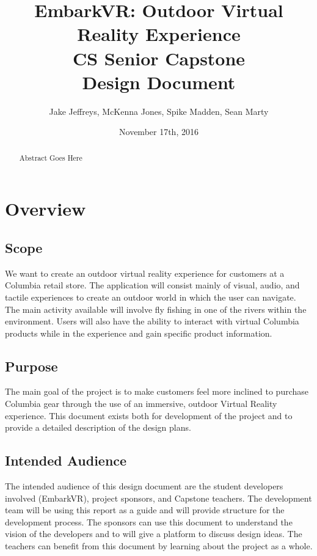 \documentclass[10pt,journal,compsoc,onecolumn, draftclsnofoot]{IEEEtran}
\title{
EmbarkVR: Outdoor Virtual Reality Experience \\
CS Senior Capstone \\
Design Document\\
\vspace{3cm}
}
\author{Jake Jeffreys, McKenna Jones, Spike Madden, Sean Marty}
\date{November 17th, 2016}
\begin{document}
\begin{titlepage}
\vspace{3cm}
\maketitle
\vspace{3cm}
\begin{abstract}
Abstract Goes Here
\end{abstract}

\end{titlepage}
\tableofcontents
\clearpage

\section{Overview}
\subsection{Scope}
We want to create an outdoor virtual reality experience for customers at a Columbia retail store. The application will consist mainly of visual, audio, and tactile experiences to create an outdoor world in which the user can navigate. The main activity available will involve fly fishing in one of the rivers within the environment. Users will also have the ability to interact with virtual Columbia products while in the experience and gain specific product information.

\subsection{Purpose}
The main goal of the project is to make customers feel more inclined to purchase Columbia gear through the use of an immersive, outdoor Virtual Reality experience. This document exists both for development of the project and to provide a detailed description of the design plans.

\subsection{Intended Audience}
The intended audience of this design document are the student developers involved (EmbarkVR), project sponsors, and Capstone teachers. The development team will be using this report as a guide and will provide structure for the development process. The sponsors can use this document to understand the vision of the developers and to will give a platform to discuss design ideas. The teachers can benefit from this document by learning about the project as a whole.
\end{document}
